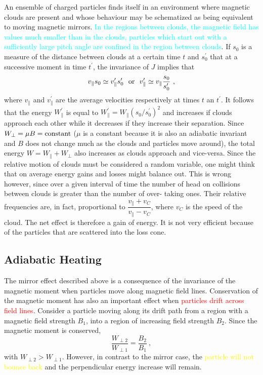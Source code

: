 \documentclass[12pt,a4paper]{article}
\begin{document}
An ensemble of charged particles finds itself in an environment where magnetic clouds are present and whose behaviour may be schematized as being equivalent to moving magnetic mirrors. \textcolor{cyan}{In the regions between clouds, the magnetic field has values much smaller than in the clouds, particles which start out with a sufficiently large pitch angle are confined in the region between clouds}. If $s_0$ is a measure of the distance between clouds at a certain time $t$ and $s_0^\prime$ that at a successive moment in time $t^\prime$, the invariance of $J$ implies that
\begin{equation*}
v_\parallel s_0 \simeq v^\prime_\parallel s^\prime_0  ~~{\rm or} ~~v^\prime_\parallel \simeq v_\parallel \frac{s_0 }{s^\prime_0} ~,
\end{equation*}
where $v_\parallel$ and $v_\parallel^\prime$ are the average velocities respectively at times $t$ an $t^\prime$. It follows that the energy $W_\parallel^\prime$ is equal to $W_\parallel^\prime = W_\parallel (s_0/s_0^\prime)^2$ and increases if clouds approach each other while it decreases if they increase their separation. Since $W_\perp = \mu B = {\rm constant}$ ($\mu$ is a constant because it is also an adiabatic invariant and $B$ does not change much as the clouds and particles move around), the total energy $W = W_\parallel +W_\perp$ also increases as clouds approach and vice-versa. Since the relative motion of clouds must be considered a random variable, one might think that on average energy gains and losses might balance out. This is wrong however, since over a given interval of time the number of head on collisions between clouds is greater than the number of over- taking ones. Their relative frequencies are, in fact, proportional to $\dfrac{v_\parallel +v_C}{v_\parallel -v_C}$, where $v_C$ is the speed of the cloud. The net effect is therefore a gain of energy. It is not very efficient because of the particles that are scattered into the loss cone.


\subsection{Adiabatic Heating}
\cite{1996bspp.book.....B} The mirror effect described above is a consequence of the invariance of the magnetic moment when particles move along magnetic field lines. Conservation of the magnetic moment has also an important effect when \textcolor{red}{particles drift across field lines}. Consider a particle moving along its drift path from a region with a magnetic field strength $B_1$, into a region of increasing field strength $B_2$. Since the magnetic moment is conserved, 
\begin{equation}
\dfrac{W_{\perp 2}}{W_{\perp 1}} = \dfrac{B_2}{B_1} ~,
\end{equation}
with $W_{\perp 2} > W_{\perp 1}$. However, in contrast to the mirror case, the \textcolor{yellow}{particle will not bounce back} and the perpendicular energy increase will remain.
\end{document}
